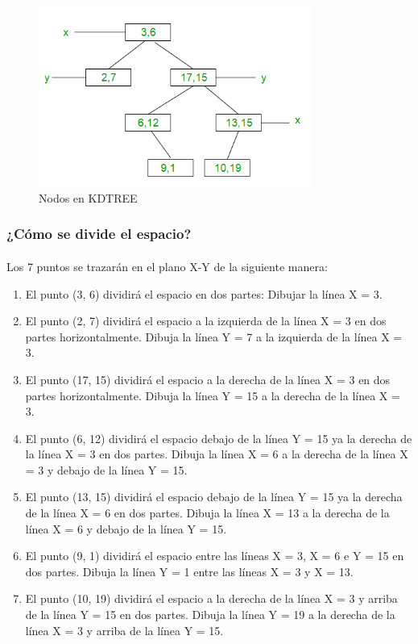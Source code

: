 \documentclass{article}
\begin{document}
\begin{figure}[h!]
	\centering
	\includegraphics[width=0.8\textwidth]{img/kdtree_1.png}
	\caption{Nodos en KDTREE}
	\label{fig:kdtree_01}
\end{figure}

\subsubsection{¿Cómo se divide el espacio?}
\paragraph{}
Los 7 puntos se trazarán en el plano X-Y de la siguiente manera:

\begin{enumerate}
	\item El punto (3, 6) dividirá el espacio en dos partes: Dibujar la línea X = 3.
	\item El punto (2, 7) dividirá el espacio a la izquierda de la línea X = 3 en dos partes horizontalmente. Dibuja la línea Y = 7 a la izquierda de la línea X = 3.
	\item El punto (17, 15) dividirá el espacio a la derecha de la línea X = 3 en dos partes horizontalmente. Dibuja la línea Y = 15 a la derecha de la línea X = 3.
	\item El punto (6, 12) dividirá el espacio debajo de la línea Y = 15 ya la derecha de la línea X = 3 en dos partes. Dibuja la línea X = 6 a la derecha de la línea X = 3 y debajo de la línea Y = 15.
	\item El punto (13, 15) dividirá el espacio debajo de la línea Y = 15 ya la derecha de la línea X = 6 en dos partes. Dibuja la línea X = 13 a la derecha de la línea X = 6 y debajo de la línea Y = 15.
	\item El punto (9, 1) dividirá el espacio entre las líneas X = 3, X = 6 e Y = 15 en dos partes. Dibuja la línea Y = 1 entre las líneas X = 3 y X = 13.
	\item El punto (10, 19) dividirá el espacio a la derecha de la línea X = 3 y arriba de la línea Y = 15 en dos partes. Dibuja la línea Y = 19 a la derecha de la línea X = 3 y arriba de la línea Y = 15.
\end{enumerate}
\end{document}
